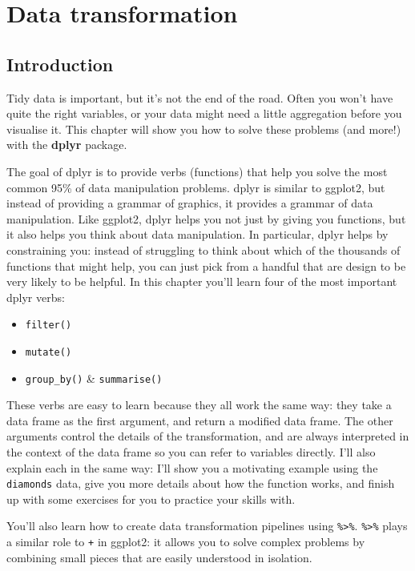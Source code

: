 \chapter{Data transformation}\label{cha:dplyr}

\section{Introduction}

Tidy data is important, but it's not the end of the road. Often you
won't have quite the right variables, or your data might need a little
aggregation before you visualise it. This chapter will show you how to
solve these problems (and more!) with the \textbf{dplyr} package.
 

The goal of dplyr is to provide verbs (functions) that help you solve
the most common 95\% of data manipulation problems. dplyr is similar to
ggplot2, but instead of providing a grammar of graphics, it provides a
grammar of data manipulation. Like ggplot2, dplyr helps you not just by
giving you functions, but it also helps you think about data
manipulation. In particular, dplyr helps by constraining you: instead of
struggling to think about which of the thousands of functions that might
help, you can just pick from a handful that are design to be very likely
to be helpful. In this chapter you'll learn four of the most important
dplyr verbs:

\begin{itemize}
\tightlist
\item
  \texttt{filter()}
\item
  \texttt{mutate()}
\item
  \texttt{group\_by()} \& \texttt{summarise()}
\end{itemize}

These verbs are easy to learn because they all work the same way: they
take a data frame as the first argument, and return a modified data
frame. The other arguments control the details of the transformation,
and are always interpreted in the context of the data frame so you can
refer to variables directly. I'll also explain each in the same way:
I'll show you a motivating example using the \texttt{diamonds} data,
give you more details about how the function works, and finish up with
some exercises for you to practice your skills with.

You'll also learn how to create data transformation pipelines using
\texttt{\%\textgreater{}\%}. \texttt{\%\textgreater{}\%} plays a similar
role to \texttt{+} in ggplot2: it allows you to solve complex problems
by combining small pieces that are easily understood in isolation.

